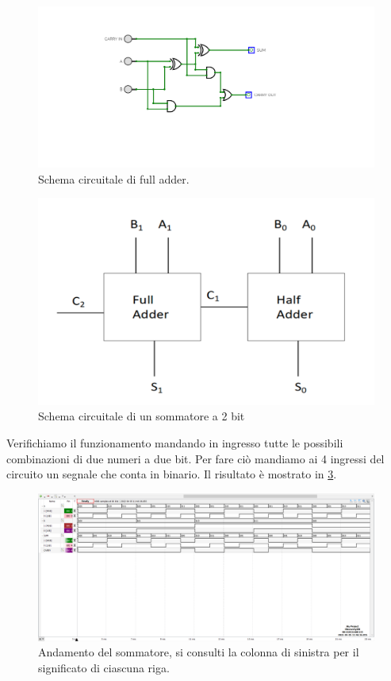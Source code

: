 \documentclass[10pt, a4paper, italian]{article}
\begin{document}
\begin{figure}[htbp]
    \centering
    \includegraphics[width=0.6\linewidth]{full.png}
    \caption{Schema circuitale di full adder.}
    \label{fig:fulladder}
\end{figure}

\begin{figure}[htbp]
    \centering
    \includegraphics[width=0.6\linewidth]{sum.png}
    \caption{Schema circuitale di un sommatore a 2 bit}
    \label{fig: sommatore}
\end{figure}

Verifichiamo il funzionamento mandando in ingresso tutte le possibili combinazioni di due numeri a due bit. Per fare ciò mandiamo ai 4 ingressi del circuito un segnale che conta in binario. Il risultato è mostrato in \cref{fig: faAD2}.

\begin{figure}[htbp]
    \centering
    \includegraphics[width=\linewidth]{sum_time.png}
    \caption{Andamento del sommatore, si consulti la colonna di sinistra per il significato di ciascuna riga.}
    \label{fig: faAD2}
\end{figure}
\end{document}

